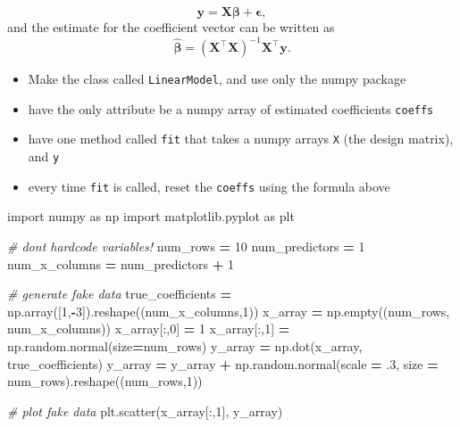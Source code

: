 \documentclass[
  12pt,
  krantz2]{krantz}
\makeatletter
\newenvironment{Shaded}{\begin{snugshade}}{\end{snugshade}}
\newcommand{\CommentTok}[1]{\textcolor[rgb]{0.37,0.37,0.37}{\textit{#1}}}
\newcommand{\DecValTok}[1]{\textcolor[rgb]{0.06,0.06,0.06}{#1}}
\newcommand{\FloatTok}[1]{\textcolor[rgb]{0.06,0.06,0.06}{#1}}
\newcommand{\ImportTok}[1]{#1}
\newcommand{\NormalTok}[1]{#1}
\newcommand{\OperatorTok}[1]{\textcolor[rgb]{0.43,0.43,0.43}{\textbf{#1}}}
\providecommand{\tightlist}{%
  \setlength{\itemsep}{0pt}\setlength{\parskip}{0pt}}
\newenvironment{kframe}{%
\medskip{}
\setlength{\fboxsep}{.8em}
 \def\at@end@of@kframe{}%
 \ifinner\ifhmode%
  \def\at@end@of@kframe{\end{minipage}}%
  \begin{minipage}{\columnwidth}%
 \fi\fi%
 \def\FrameCommand##1{\hskip\@totalleftmargin \hskip-\fboxsep
 \colorbox{shadecolor}{##1}\hskip-\fboxsep
     \hskip-\linewidth \hskip-\@totalleftmargin \hskip\columnwidth}%
 \MakeFramed {\advance\hsize-\width
   \@totalleftmargin\z@ \linewidth\hsize
   \@setminipage}}%
 {\par\unskip\endMakeFramed%
 \at@end@of@kframe}
\renewenvironment{Shaded}{\begin{kframe}}{\end{kframe}}
\makeatother
\begin{document}
\[
\mathbf{y} = 
\mathbf{X}\boldsymbol{\beta} + \boldsymbol{\epsilon},
\]
and the estimate for the coefficient vector can be written as
\[
\hat{\boldsymbol{\beta}} = \left(\mathbf{X}^\intercal \mathbf{X} \right)^{-1}\mathbf{X}^\intercal \mathbf{y}.
\]

\begin{itemize}
\tightlist
\item
  Make the class called \texttt{LinearModel}, and use only the numpy package
\item
  have the only attribute be a numpy array of estimated coefficients \texttt{coeffs}
\item
  have one method called \texttt{fit} that takes a numpy arrays \texttt{X} (the design matrix), and \texttt{y}
\item
  every time \texttt{fit} is called, reset the \texttt{coeffs} using the formula above
\end{itemize}

\begin{Shaded}
\begin{Highlighting}[]
\ImportTok{import}\NormalTok{ numpy }\ImportTok{as}\NormalTok{ np}
\ImportTok{import}\NormalTok{ matplotlib.pyplot }\ImportTok{as}\NormalTok{ plt}

\CommentTok{\# don\textquotesingle{}t hardcode variables!}
\NormalTok{num\_rows }\OperatorTok{=} \DecValTok{10}
\NormalTok{num\_predictors }\OperatorTok{=} \DecValTok{1}
\NormalTok{num\_x\_columns }\OperatorTok{=}\NormalTok{ num\_predictors }\OperatorTok{+} \DecValTok{1}

\CommentTok{\# generate fake data }
\NormalTok{true\_coefficients }\OperatorTok{=}\NormalTok{ np.array([}\DecValTok{1}\NormalTok{,}\OperatorTok{{-}}\DecValTok{3}\NormalTok{]).reshape((num\_x\_columns,}\DecValTok{1}\NormalTok{))}
\NormalTok{x\_array }\OperatorTok{=}\NormalTok{ np.empty((num\_rows, num\_x\_columns))}
\NormalTok{x\_array[:,}\DecValTok{0}\NormalTok{] }\OperatorTok{=} \DecValTok{1}
\NormalTok{x\_array[:,}\DecValTok{1}\NormalTok{] }\OperatorTok{=}\NormalTok{ np.random.normal(size}\OperatorTok{=}\NormalTok{num\_rows)}
\NormalTok{y\_array }\OperatorTok{=}\NormalTok{ np.dot(x\_array, true\_coefficients) }
\NormalTok{y\_array }\OperatorTok{=}\NormalTok{ y\_array }\OperatorTok{+}\NormalTok{ np.random.normal(scale }\OperatorTok{=} \FloatTok{.3}\NormalTok{, size }\OperatorTok{=}\NormalTok{ num\_rows).reshape((num\_rows,}\DecValTok{1}\NormalTok{))}

\CommentTok{\# plot fake data }
\NormalTok{plt.scatter(x\_array[:,}\DecValTok{1}\NormalTok{], y\_array)}
\end{Highlighting}
\end{Shaded}
\end{document}
